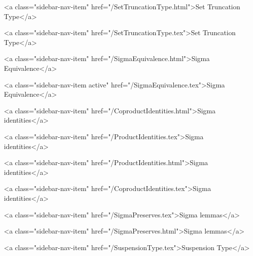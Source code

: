       
        
          <a class="sidebar-nav-item" href="/SetTruncationType.html">Set Truncation Type</a>
        
      
    
      
        
          <a class="sidebar-nav-item" href="/SetTruncationType.tex">Set Truncation Type</a>
        
      
    
      
        
          <a class="sidebar-nav-item" href="/SigmaEquivalence.html">Sigma Equivalence</a>
        
      
    
      
        
          <a class="sidebar-nav-item active" href="/SigmaEquivalence.tex">Sigma Equivalence</a>
        
      
    
      
        
          <a class="sidebar-nav-item" href="/CoproductIdentities.html">Sigma identities</a>
        
      
    
      
        
          <a class="sidebar-nav-item" href="/ProductIdentities.tex">Sigma identities</a>
        
      
    
      
        
          <a class="sidebar-nav-item" href="/ProductIdentities.html">Sigma identities</a>
        
      
    
      
        
          <a class="sidebar-nav-item" href="/CoproductIdentities.tex">Sigma identities</a>
        
      
    
      
        
          <a class="sidebar-nav-item" href="/SigmaPreserves.tex">Sigma lemmas</a>
        
      
    
      
        
          <a class="sidebar-nav-item" href="/SigmaPreserves.html">Sigma lemmas</a>
        
      
    
      
        
          <a class="sidebar-nav-item" href="/SuspensionType.tex">Suspension Type</a>
        
